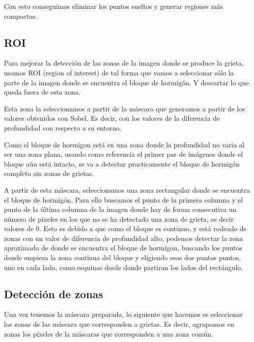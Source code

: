 Con esto conseguimos eliminar los puntos sueltos y generar regiones más compactas.

\subsection{ROI}
Para mejorar la detección de las zonas de la imagen donde se produce la grieta, usamos ROI (region of interest) de tal forma que vamos a seleccionar sólo la parte de la imagen donde se encuentra el bloque de hormigón. Y descartar lo que queda fuera de esta zona.

Esta zona la seleccionamos a partir de la máscara que generamos a partir de los valores obtenidos con Sobel. Es decir, con los valores de la diferencia de profundidad con respecto a su entorno.

Como el bloque de hormigon está en una zona donde la profundidad no varia al ser una zona plana, usando como referencia el primer par de imágenes donde el bloque aún está intacto, se va a detectar practicamente el bloque de hormigón completo sin zonas de grietas. 

A partir de esta máscara, seleccionamos una zona rectangular donde se encuentra el bloque de hormigón. Para ello buscamos el punto de la primera columna y el punto de la última columna de la imagen donde hay de forma consecutiva un número de píxeles en los que no se ha detectado una zona de grieta, es decir valores de 0. Esto es debido a que como el bloque es continuo, y está rodeado de zonas con un valor de diferencia de profundidad alto, podemos detectar la zona aproximada de donde se encuentra el bloque de hormigon, buscando los puntos donde empieza la zona continua del bloque y eligiendo esos dos puntos puntos, uno en cada lado, como esquinas desde donde partiran los lados del rectángulo.



\subsection{Detección de zonas}
Una vez tenemos la máscara preparada, lo siguiente que hacemos es seleccionar las zonas de las máscara que corresponden a grietas. Es decir, agrupamos en zonas los píxeles de la máscaras que corresponden a una zona común.

